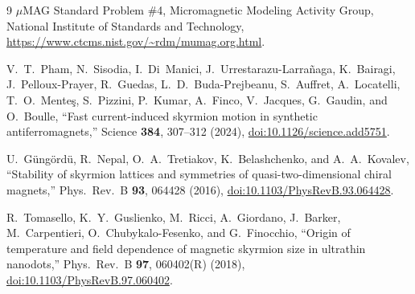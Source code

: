 \documentclass[11pt]{article}
\begin{document}
\begin{thebibliography}{9}
$\mu$MAG Standard Problem \#4, Micromagnetic Modeling Activity Group,
National Institute of Standards and Technology,
\url{https://www.ctcms.nist.gov/~rdm/mumag.org.html}.

V.~T.~Pham, N.~Sisodia, I.~Di~Manici, J.~Urrestarazu-Larra\~naga,
K.~Bairagi, J.~Pelloux-Prayer, R.~Guedas, L.~D.~Buda-Prejbeanu,
S.~Auffret, A.~Locatelli, T.~O.~Mente\c{s}, S.~Pizzini, P.~Kumar,
A.~Finco, V.~Jacques, G.~Gaudin, and O.~Boulle,
``Fast current-induced skyrmion motion in synthetic
antiferromagnets,'' Science \textbf{384}, 307--312 (2024),
\href{https://doi.org/10.1126/science.add5751}{doi:10.1126/science.add5751}.

U.~G\"ung\"ord\"u, R.~Nepal, O.~A.~Tretiakov, K.~Belashchenko, and
A.~A.~Kovalev, ``Stability of skyrmion lattices and symmetries of
quasi-two-dimensional chiral magnets,'' Phys.\ Rev.\ B \textbf{93},
064428 (2016),
\href{https://doi.org/10.1103/PhysRevB.93.064428}{doi:10.1103/PhysRevB.93.064428}.

R.~Tomasello, K.~Y.~Guslienko, M.~Ricci, A.~Giordano, J.~Barker,
M.~Carpentieri, O.~Chubykalo-Fesenko, and G.~Finocchio, ``Origin of
temperature and field dependence of magnetic skyrmion size in
ultrathin nanodots,'' Phys.\ Rev.\ B \textbf{97}, 060402(R) (2018),
\href{https://doi.org/10.1103/PhysRevB.97.060402}{doi:10.1103/PhysRevB.97.060402}.
\end{thebibliography}
\end{document}
